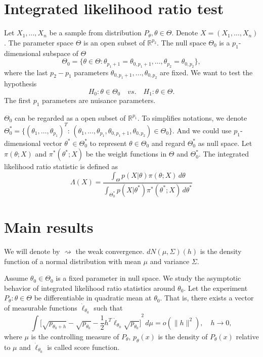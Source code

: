 \documentclass[3p]{elsarticle}
\begin{document}
\section{Integrated likelihood ratio test}

Let $X_1,\ldots,X_n$ be a sample from distribution $P_{\theta}, \theta\in\Theta$. Denote $X=(X_1,\ldots,X_n)$. The parameter space $\Theta$ is an open subset of $\mathbb{R}^{p_2}$. The null space $\Theta_0$ is a $p_1$-dimensional subspace of $\Theta$
\begin{equation}
    \Theta_0=\{\theta\in\Theta:\theta_{p_1+1}=\theta_{0,{p_1+1}},\ldots,\theta_{p_2}=\theta_{0,{p_2}}\},
\end{equation}
where the last $p_2-p_1$ parameters $\theta_{0,{p_1+1}},\ldots,\theta_{0,{p_2}}$ are fixed. We want to test the hypothesis
\begin{equation}
H_0:\theta\in \Theta_0\quad vs. \quad H_1:\theta\in \Theta.
\end{equation}
The first $p_1$ parameters are nuisance parameters.

$\Theta_0$ can be regarded as a open subset of $\mathbb{R}^{p_1}$. To simplifies notations, we denote  $\Theta^*_0=\{{(\theta_1,\ldots,\theta_{p_1})}^T:\, (\theta_1,\ldots,\theta_{p_1},\theta_{0,p_1+1},\theta_{0,p_2})\in \Theta_0\}$. And we could use $p_1$-dimensional vector $\theta^*\in
\Theta_0^*$ to represent $\theta\in\Theta_0$ and regard $\Theta_0^*$ as null space.  Let $\pi(\theta;X)$ and $\pi^*(\theta^*;X)$ be the weight functions in $\Theta$ and $\Theta_0^*$. The integrated likelihood ratio statistic is defined as
\begin{equation}\label{likelihoodRatio}
    \Lambda (X)=\frac{\int_{\Theta} p(X|\theta)\pi(\theta;X)\,d\theta}{\int_{\Theta^*_0} p(X|\theta^*)\pi^*(\theta^*;X)\,d\theta^*}
\end{equation}


\section{Main results}

We will denote by $\rightsquigarrow$ the weak convergence. 
$dN(\mu,\Sigma)(h)$ is the density function of a normal distribution with mean $\mu$ and variance $\Sigma$.

Assume $\theta_0\in\Theta_0$ is a fixed parameter in null space. We study the asymptotic behavior of integrated likelihood ratio statistics around $\theta_0$.
Let the experiment $P_\theta : \theta\in \Theta$ be differentiable in quadratic mean at $\theta_0$. That is, there exists a vector of measurable functions $\dot{\ell}_{\theta_0}$ such that
\begin{equation}
    \int {\big[\sqrt{p_{\theta_0+h}}-\sqrt{p_{\theta_0}}-\frac{1}{2}h^T\dot{\ell}_{\theta_0}\sqrt{p_{\theta_0}}\big]}^2\, d\mu=o(\|h\|^2),\quad h\to 0,
\end{equation}
where $\mu$ is the controlling measure of $P_{\theta}$, $p_{\theta}(x)$ is the density of $P_{\theta}(x)$ relative to $\mu$ and $\dot{\ell}_{\theta_0}$ is called score function.
\end{document}
